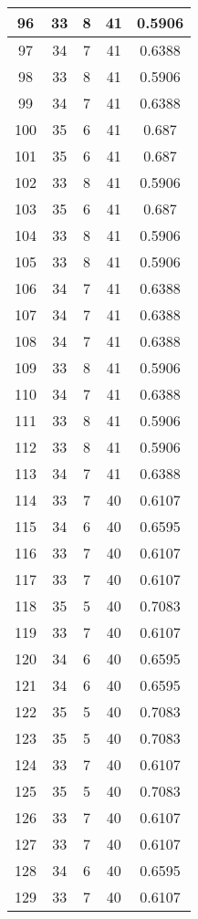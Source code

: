 \documentclass[letterpaper, 12pt]{article}
\begin{document}
\begin{longtable}{|c|c|c|c|c|}
\hline
96 & 33 & 8 & 41 & 0.5906 \\
\hline
97 & 34 & 7 & 41 & 0.6388 \\
\hline
98 & 33 & 8 & 41 & 0.5906 \\
\hline
99 & 34 & 7 & 41 & 0.6388 \\
\hline
100 & 35 & 6 & 41 & 0.687 \\
\hline
101 & 35 & 6 & 41 & 0.687 \\
\hline
102 & 33 & 8 & 41 & 0.5906 \\
\hline
103 & 35 & 6 & 41 & 0.687 \\
\hline
104 & 33 & 8 & 41 & 0.5906 \\
\hline
105 & 33 & 8 & 41 & 0.5906 \\
\hline
106 & 34 & 7 & 41 & 0.6388 \\
\hline
107 & 34 & 7 & 41 & 0.6388 \\
\hline
108 & 34 & 7 & 41 & 0.6388 \\
\hline
109 & 33 & 8 & 41 & 0.5906 \\
\hline
110 & 34 & 7 & 41 & 0.6388 \\
\hline
111 & 33 & 8 & 41 & 0.5906 \\
\hline
112 & 33 & 8 & 41 & 0.5906 \\
\hline
113 & 34 & 7 & 41 & 0.6388 \\
\hline
114 & 33 & 7 & 40 & 0.6107 \\
\hline
115 & 34 & 6 & 40 & 0.6595 \\
\hline
116 & 33 & 7 & 40 & 0.6107 \\
\hline
117 & 33 & 7 & 40 & 0.6107 \\
\hline
118 & 35 & 5 & 40 & 0.7083 \\
\hline
119 & 33 & 7 & 40 & 0.6107 \\
\hline
120 & 34 & 6 & 40 & 0.6595 \\
\hline
121 & 34 & 6 & 40 & 0.6595 \\
\hline
122 & 35 & 5 & 40 & 0.7083 \\
\hline
123 & 35 & 5 & 40 & 0.7083 \\
\hline
124 & 33 & 7 & 40 & 0.6107 \\
\hline
125 & 35 & 5 & 40 & 0.7083 \\
\hline
126 & 33 & 7 & 40 & 0.6107 \\
\hline
127 & 33 & 7 & 40 & 0.6107 \\
\hline
128 & 34 & 6 & 40 & 0.6595 \\
\hline
129 & 33 & 7 & 40 & 0.6107 \\

\end{longtable}
\end{document}
